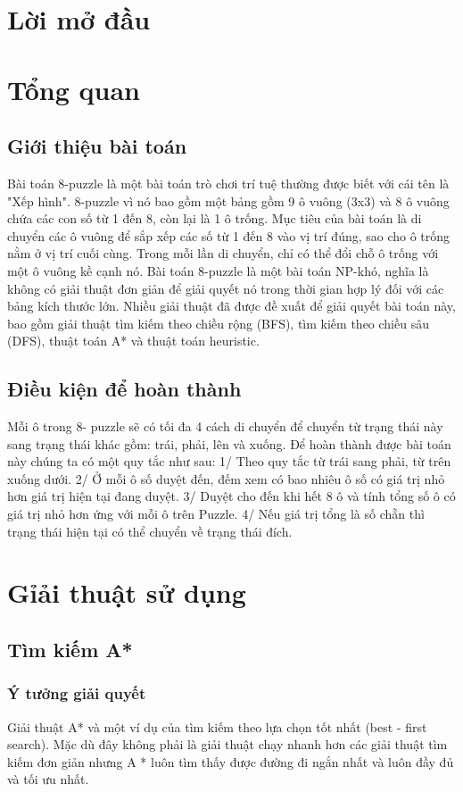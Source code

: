 \documentclass[12pt]{article}
\begin{document}
\tableofcontents
\section{Lời mở đầu}
\section{Tổng quan}
\subsection{Giới thiệu bài toán}
Bài toán 8-puzzle là một bài toán trò chơi trí tuệ thường được biết với cái tên là "Xếp hình".  8-puzzle vì nó bao gồm một bảng gồm 9 ô vuông (3x3) và 8 ô vuông chứa các con số từ 1 đến 8, còn lại là 1 ô trống.
Mục tiêu của bài toán là di chuyển các ô vuông để sắp xếp các số từ 1 đến 8 vào vị trí đúng, sao cho ô trống nằm ở vị trí cuối cùng. Trong mỗi lần di chuyển, chỉ có thể đổi chỗ ô trống với một ô vuông kề cạnh nó. 
Bài toán 8-puzzle là một bài toán NP-khó, nghĩa là không có giải thuật đơn giản để giải quyết nó trong thời gian hợp lý đối với các bảng kích thước lớn. Nhiều giải thuật đã được đề xuất để giải quyết bài toán này, bao gồm giải thuật tìm kiếm theo chiều rộng (BFS), tìm kiếm theo chiều sâu (DFS), thuật toán A* và thuật toán heuristic.

\subsection{Điều kiện để hoàn thành}
Mỗi ô trong 8- puzzle sẽ có tối đa 4 cách di chuyển để chuyển từ trạng thái này sang trạng thái khác gồm: trái, phải, lên và xuống. Để hoàn thành được bài toán này chúng ta có một quy tắc như sau:
1/ Theo quy tắc từ trái sang phải, từ trên xuống dưới.
2/ Ở mỗi ô số duyệt đến, đếm xem có bao nhiêu ô số có giá trị nhỏ hơn giá trị hiện tại đang duyệt.
3/ Duyệt cho đến khi hết 8 ô và tính tổng số ô có giá trị nhỏ hơn ứng với mỗi ô trên Puzzle.
4/ Nếu giá trị tổng là số chẵn thì trạng thái hiện tại có thể chuyển về trạng thái đích.
\section{Gỉải thuật sử dụng}
\subsection{Tìm kiếm A*}
\subsubsection{Ý tưởng giải quyết}
Giải thuật A* và một ví dụ của tìm kiếm theo lựa chọn tốt nhất (best - first search). Mặc dù đây không phải là giải thuật chạy nhanh hơn các giải thuật tìm kiếm đơn giản nhưng A * luôn tìm thấy được đường đi ngắn nhất và luôn đầy đủ và tối ưu nhất.
\end{document}
